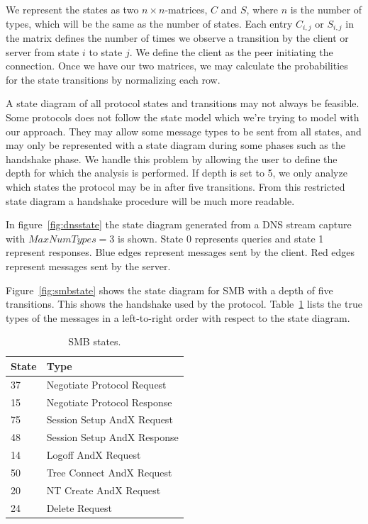 \documentclass[a4paper]{report}
\begin{document}
We represent the states as two $n \times n$-matrices, $C$ and  $S$, where 
$n$ is the number of types, which will be the same as the number of states.
Each entry $C_{i,j}$ or $S_{i,j}$ in the matrix defines the number of times
we observe a transition by the client or server from state $i$ to state $j$.
We define the client as the peer initiating the connection. Once we have our
two matrices, we may calculate the probabilities for the state transitions by
normalizing each row.

A state diagram of all protocol states and transitions may not always be
feasible. Some protocols does not follow the state model which we're 
trying to model with our approach. They may allow some message types to
be sent from all states, and may only be represented with a state diagram
during some phases such as the handshake phase. We handle this problem by
allowing the user to define the depth for which the analysis is performed.
If depth is set to 5, we only analyze which states the protocol may be in
after five transitions. From this restricted state diagram a handshake
procedure will be much more readable.


In figure~\ref{fig:dnsstate} the state diagram generated from a DNS stream
capture with $MaxNumTypes = 3$ is shown. State 0 represents queries and state 1
represent responses. Blue edges represent messages sent by the client. Red
edges represent messages sent by the server.

Figure~\ref{fig:smbstate} shows the state diagram for SMB with a depth of
five transitions. This shows the handshake used by the protocol.
Table~\ref{tab:smb} lists the true types of the messages in a left-to-right
order with respect to the state diagram.

\begin{table}
    \centering
    \captionsetup{width=0.8\textwidth}
    \caption{SMB states.}
    \begin{tabular}{ | l | l |}
        \hline
        \textbf{State}&\textbf{Type}\\ \hline
        37          & Negotiate Protocol Request    \\ \hline
        15          & Negotiate Protocol Response   \\ \hline
        75          & Session Setup AndX Request    \\ \hline
        48          & Session Setup AndX Response   \\ \hline
        14          & Logoff AndX Request           \\ \hline
        50          & Tree Connect AndX Request     \\ \hline
        20          & NT Create AndX Request        \\ \hline
        24          & Delete Request                \\ \hline
    \end{tabular}
    \label{tab:smb}
\end{table}
\end{document}
